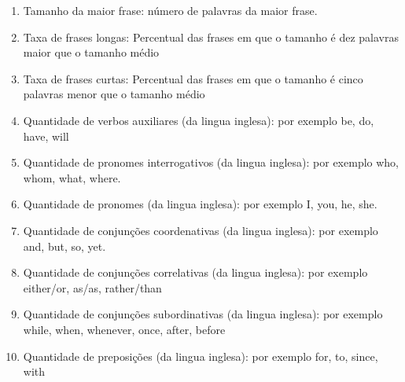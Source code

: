 \begin{enumerate}   
	\item Tamanho da maior frase: número de palavras da maior frase.%
	\item Taxa de frases longas: Percentual das frases em que o tamanho é dez palavras maior que o tamanho médio%
	\item Taxa de frases curtas: Percentual das frases em que o tamanho é cinco palavras menor que o tamanho médio %
	\item Quantidade de verbos auxiliares (da lingua inglesa): por exemplo be, do, have, will %
    \item Quantidade de pronomes interrogativos (da lingua inglesa): por exemplo who, whom, what, where.%
    \item Quantidade de pronomes (da lingua inglesa): por exemplo I, you, he, she.%


    \item Quantidade de conjunções coordenativas (da lingua inglesa): por exemplo and, but, so, yet.%
	\item Quantidade de conjunções correlativas (da lingua inglesa): por exemplo either/or, as/as, rather/than %
	\item Quantidade de conjunções subordinativas (da lingua inglesa): por exemplo while, when, whenever, once, after, before%


    \item Quantidade de preposições (da lingua inglesa): por exemplo for, to, since, with%


\end{enumerate}
